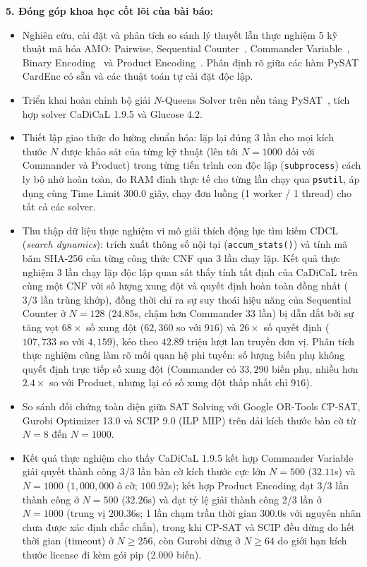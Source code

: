 \documentclass[11pt,a4paper]{article}
\begin{document}
\noindent\textbf{5. Đóng góp khoa học cốt lõi của bài báo:}
\begin{itemize}
    \item Nghiên cứu, cài đặt và phân tích so sánh lý thuyết lẫn thực nghiệm 5 kỹ thuật mã hóa AMO: Pairwise, Sequential Counter~\cite{sinz2005towards}, Commander Variable~\cite{klieber2007efficient}, Binary Encoding~\cite{prestwich2009cnf,frisch2010sat} và Product Encoding~\cite{chen2010product}. Phân định rõ giữa các hàm PySAT CardEnc có sẵn và các thuật toán tự cài đặt độc lập.
    \item Triển khai hoàn chỉnh bộ giải $N$-Queens Solver trên nền tảng PySAT~\cite{ignatiev2018pysat}, tích hợp solver CaDiCaL 1.9.5 và Glucose 4.2.
    \item Thiết lập giao thức đo lường chuẩn hóa: lặp lại đúng 3 lần cho mọi kích thước $N$ được khảo sát của từng kỹ thuật (lên tới $N=1000$ đối với Commander và Product) trong từng tiến trình con độc lập (\texttt{subprocess}) cách ly bộ nhớ hoàn toàn, đo RAM đỉnh thực tế cho từng lần chạy qua \texttt{psutil}, áp dụng cùng Time Limit 300.0 giây, chạy đơn luồng (1 worker / 1 thread) cho tất cả các solver.
    \item Thu thập dữ liệu thực nghiệm vi mô giải thích động lực tìm kiếm CDCL (\textit{search dynamics}): trích xuất thông số nội tại (\texttt{accum\_stats()}) và tính mã băm SHA-256 của từng công thức CNF qua 3 lần chạy lặp. Kết quả thực nghiệm 3 lần chạy lặp độc lập quan sát thấy tính tất định của CaDiCaL trên cùng một CNF với số lượng xung đột và quyết định hoàn toàn đồng nhất ($3/3$ lần trùng khớp), đồng thời chỉ ra sự suy thoái hiệu năng của Sequential Counter ở $N=128$ ($24.85$s, chậm hơn Commander 33 lần) bị dẫn dắt bởi sự tăng vọt $68\times$ số xung đột ($62{,}360$ so với $916$) và $26\times$ số quyết định ($107{,}733$ so với $4{,}159$), kéo theo $42.89$ triệu lượt lan truyền đơn vị. Phân tích thực nghiệm cũng làm rõ mối quan hệ phi tuyến: số lượng biến phụ không quyết định trực tiếp số xung đột (Commander có $33{,}290$ biến phụ, nhiều hơn $2.4\times$ so với Product, nhưng lại có số xung đột thấp nhất chỉ $916$).
    \item So sánh đối chứng toàn diện giữa SAT Solving với Google OR-Tools CP-SAT, Gurobi Optimizer 13.0 và SCIP 9.0 (ILP MIP) trên dải kích thước bàn cờ từ $N = 8$ đến $N = 1000$.
    \item Kết quả thực nghiệm cho thấy CaDiCaL 1.9.5 kết hợp Commander Variable giải quyết thành công 3/3 lần bàn cờ kích thước cực lớn $N = 500$ ($32.11$s) và $N = 1000$ ($1{,}000{,}000$ ô cờ; $100.92$s); kết hợp Product Encoding đạt 3/3 lần thành công ở $N = 500$ ($32.26$s) và đạt tỷ lệ giải thành công 2/3 lần ở $N = 1000$ (trung vị $200.36$s; 1 lần chạm trần thời gian 300.0s với nguyên nhân chưa được xác định chắc chắn), trong khi CP-SAT và SCIP đều dừng do hết thời gian (timeout) ở $N \ge 256$, còn Gurobi dừng ở $N \ge 64$ do giới hạn kích thước license đi kèm gói pip (2.000 biến).
\end{itemize}
\end{document}
